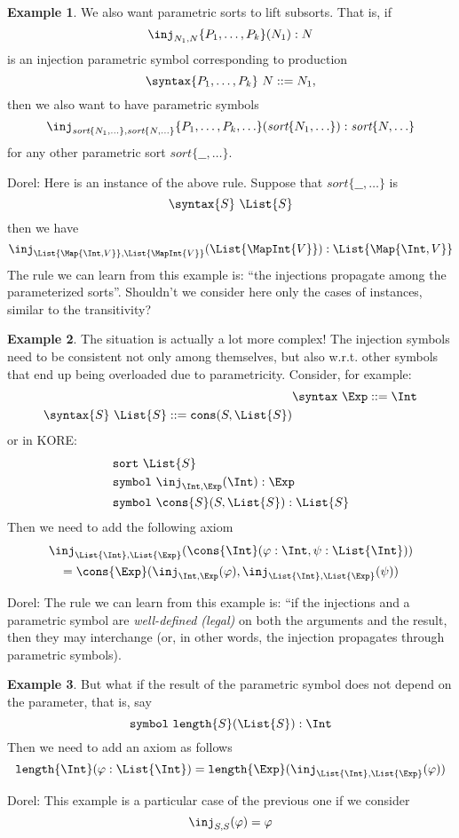 \documentclass{article}
\newcommand\comment[2]{\par\noindent\color{red}#1: #2\color{black}\par\noindent}
\newcommand\dl{\comment{Dorel}}
\theoremstyle{definition}
\newtheorem{example}{Example}[section]
\theoremstyle{definition}
\theoremstyle{definition}
\theoremstyle{theorem}
\theoremstyle{theorem}
\theoremstyle{theorem}
\newcommand{\poly}[2]{\texttt{#1}\{#2\}}
\newcommand{\Sort}[1]{\textit{sort}\{#1\}}
\newcommand{\KWsymbol}{\texttt{symbol}}
\newcommand{\sort}{\texttt{sort}}
\begin{document}
\begin{example}\label{consistency-lifting}
We also want parametric sorts to lift subsorts.
That is, if
\[\inj_{N_1,N}\{P_1,\ldots,P_k\}(N_1):N\]
is an injection parametric symbol corresponding to production
\[\syntax\{P_1,\ldots,P_k\}\ N::=N_1,\]
then we also want to have parametric symbols
\[\inj_{\Sort{N_1,\ldots},\Sort{N,\ldots}}
   \{P_1,\ldots,P_k,\ldots\}
    (\Sort{N_1,\ldots}) : \Sort{N,\ldots}\]
for any other parametric sort \(\Sort{\_\!\_,\ldots}\).
\dl{Here is an instance of the above rule. Suppose that \(\Sort{\_\!\_,\ldots}\) is
\[\syntax\{S\}\ \List{S}\]
then we have
\[\inj_{\List{\Map{\Int,V}},\List{\MapInt{V}}}(\List{\MapInt{V}}):\List{\Map{\Int,V}}\]
The rule we can learn from this example is: ``the injections propagate among the parameterized sorts''. Shouldn't we consider here only the cases of instances, similar to the transitivity?
}
\end{example}

\begin{example}\label{consistency-parametric}
The situation is actually a lot more complex!
The injection symbols need to be consistent not only among
themselves, but also w.r.t. other symbols that end up
being overloaded due to parametricity.
Consider, for example:
\begin{align*}
&\syntax\ \Exp::=\Int\\
\syntax\{S\}\ \List{S}::=\texttt{cons}(S,\List{S})
\end{align*}
or in KORE:
\begin{align*}
&\sort\ \List{S}\\
&\KWsymbol\ \inj_{\Int,\Exp}(\Int):\Exp\\
&\KWsymbol\ \cons{S}(S,\List{S}):\List{S}
\end{align*}
Then we need to add the following axiom
\begin{multline*}
\inj_{\List{\Int},\List{\Exp}}(\cons{\Int}(\varphi:\Int,\psi:\List{\Int})) \\
 = \cons{\Exp}(\inj_{\Int,\Exp}(\varphi),\inj_{\List{\Int},\List{\Exp}}(\psi))
\end{multline*}
\dl{The rule we can learn from this example is: ``if the injections and a parametric symbol are \emph{well-defined (legal)} on both the arguments and the result, then they may
interchange (or, in other words, the injection propagates through parametric symbols).
}
\end{example}

\begin{example}\label{consistency-parametric-arg-only}
But what if the result of the parametric symbol
does not depend on the parameter, that is, say
\[\KWsymbol\ \poly{length}{S}(\List{S}):\Int\]
Then we need to add an axiom as follows
\[\poly{length}{\Int}(\varphi:\List{\Int})
= \poly{length}{\Exp}(\inj_{\List{\Int},\List{\Exp}}(\varphi))\]
\dl{This example is a particular case of the previous one if we consider
\[\inj_{S,S}(\varphi)=\varphi\]
}
\end{example}
\end{document}
